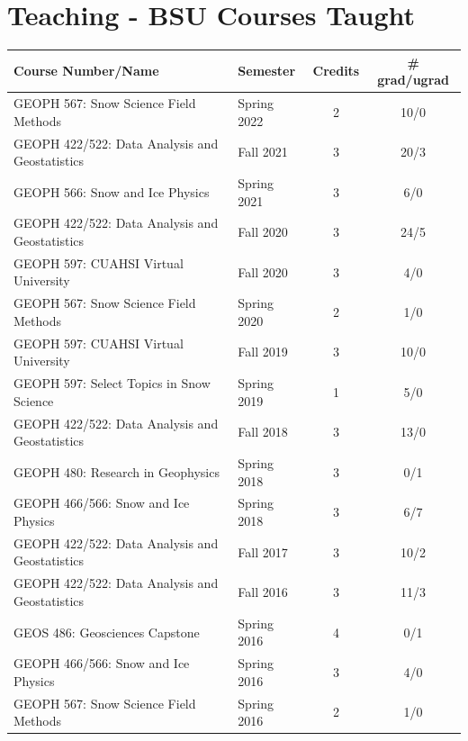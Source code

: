 \documentclass[11pt]{article}
\renewcommand\arraystretch{1}
\begin{document}
\begin{table}[!htbp]
\section*{Teaching - BSU Courses Taught}
\renewcommand\arraystretch{0.7}
  \centering
  \begin{tabular}{|l|l|c|c|}
\hline
\textbf{Course Number/Name} & \textbf{Semester} & \textbf{Credits} & \textbf{\# grad/ugrad} \\ \hline \hline

GEOPH 567: Snow Science Field Methods & Spring 2022 & 2 & 10/0 \\ \hline
GEOPH 422/522: Data Analysis and Geostatistics & Fall 2021 & 3 & 20/3 \\ \hline

GEOPH 566: Snow and Ice Physics & Spring 2021 & 3 & 6/0 \\ \hline
GEOPH 422/522: Data Analysis and Geostatistics & Fall 2020 & 3 & 24/5 \\ \hline
GEOPH 597: CUAHSI Virtual University & Fall 2020 & 3 & 4/0 \\ \hline
GEOPH 567: Snow Science Field Methods & Spring 2020 & 2 & 1/0 \\ \hline
GEOPH 597: CUAHSI Virtual University & Fall 2019 & 3 & 10/0 \\ \hline
GEOPH 597: Select Topics in Snow Science & Spring 2019 & 1 & 5/0 \\ \hline
GEOPH 422/522: Data Analysis and Geostatistics & Fall 2018 & 3 & 13/0 \\ \hline
GEOPH 480: Research in Geophysics & Spring 2018 & 3 & 0/1 \\ \hline
GEOPH 466/566: Snow and Ice Physics & Spring 2018 & 3 & 6/7 \\ \hline
GEOPH 422/522: Data Analysis and Geostatistics & Fall 2017 & 3 & 10/2 \\ \hline
GEOPH 422/522: Data Analysis and Geostatistics & Fall 2016 & 3 & 11/3 \\ \hline
GEOS 486: Geosciences Capstone & Spring 2016 & 4 & 0/1 \\ \hline
GEOPH 466/566: Snow and Ice Physics & Spring 2016 & 3 & 4/0 \\ \hline
GEOPH 567: Snow Science Field Methods & Spring 2016 & 2 & 1/0 \\ \hline

\end{tabular}
\end{table}
\end{document}
